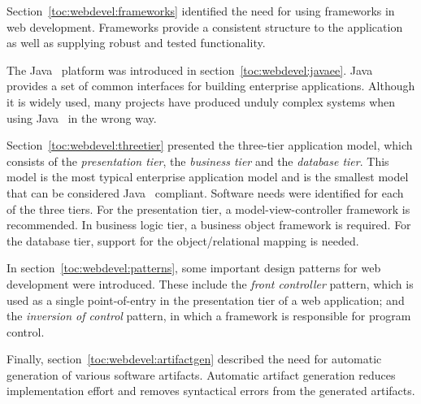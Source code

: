Section~\ref{toc:webdevel:frameworks} identified the need for using 
frameworks in web development. Frameworks provide a consistent 
structure to the application as well as supplying robust and tested 
functionality.

The Java~ platform was introduced in 
section~\ref{toc:webdevel:javaee}. Java~ provides a set of 
common interfaces for building enterprise applications. Although it is 
widely used, many projects have produced unduly complex systems when 
using Java~ in the wrong way.

Section~\ref{toc:webdevel:threetier} presented the three-tier 
application model, which consists of the \textsl{presentation tier}, 
the \textsl{business tier} and the \textsl{database tier}. This model 
is the most typical enterprise application model and is the smallest 
model that can be considered Java~ compliant. Software 
needs were identified for each of the three tiers. For the 
presentation tier, a model-view-controller framework is recommended. 
In business logic tier, a business object framework is required. For 
the database tier, support for the object/relational mapping is needed.

In section~\ref{toc:webdevel:patterns}, some important design patterns 
for web development were introduced. These include the \textsl{front 
controller} pattern, which is used as a single point-of-entry in the 
presentation tier of a web application; and the \textsl{inversion of 
control} pattern, in which a framework is responsible for program 
control.

Finally, section~\ref{toc:webdevel:artifactgen} described the need for 
automatic generation of various software artifacts. Automatic artifact 
generation reduces implementation effort and removes syntactical 
errors from the generated artifacts.

